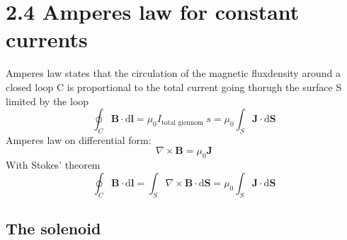 \documentclass[
12pt, reprint, aip, onecolumn, notitlepage
]{revtex4-1}
\begin{document}
\section{2.4 Amperes law for constant currents}
Amperes law states that the circulation of the magnetic fluxdensity around a closed loop C is proportional to the total current going thorugh the surface S limited by the loop
\begin{equation}
\oint_{C} \mathbf{B} \cdot \mathrm{d} \mathbf{l}=\mu_{0} I_{\text {total giennom }} s=\mu_{0} \int_{S} \mathbf{J} \cdot \mathrm{d} \mathbf{S}
\end{equation}
Amperes law on differential form:
\begin{equation}
\nabla \times \mathbf{B}=\mu_{0} \mathbf{J}
\end{equation} 
With Stokes' theorem 
\begin{equation}
\oint_{C} \mathbf{B} \cdot \mathrm{d} \mathbf{l}=\int_{S} \nabla \times \mathbf{B} \cdot \mathrm{d} \mathbf{S}=\mu_{0} \int_{S} \mathbf{J} \cdot \mathrm{d} \mathbf{S}
\end{equation}
\subsection{The solenoid}
\end{document}
